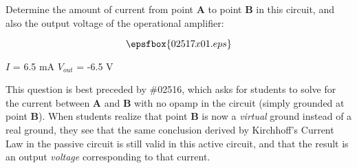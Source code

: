 

Determine the amount of current from point {\bf A} to point {\bf B} in this circuit, and also the output voltage of the operational amplifier:

$$\epsfbox{02517x01.eps}$$







$I$ = 6.5 mA \hskip 50pt $V_{out}$ = -6.5 V







This question is best preceded by \#02516, which asks for students to solve for the current between {\bf A} and {\bf B} with no opamp in the circuit (simply grounded at point {\bf B}).  When students realize that point {\bf B} is now a {\it virtual} ground instead of a real ground, they see that the same conclusion derived by Kirchhoff's Current Law in the passive circuit is still valid in this active circuit, and that the result is an output {\it voltage} corresponding to that current.




